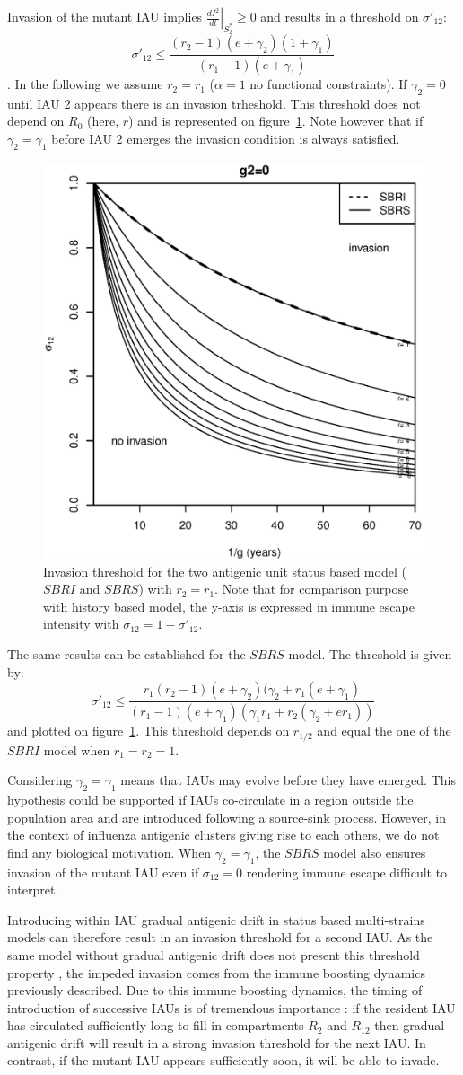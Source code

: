 Invasion of the mutant IAU implies $\left. \frac{d I^2}{d t}
\right|_{S_2^*} \geq 0$ and results in a threshold on $\sigma'_{12}$:
 $$\sigma'_{12} \leq \frac{(r_2-1)(e+\gamma_2)(1+\gamma_1)}{(r_1-1)(e+\gamma_1)}$$.  
 In the following we assume $r_2=r_1$ ($\alpha=1$ no functional
 constraints). If $\gamma_2=0$ until IAU 2 appears there is an
 invasion trheshold. This threshold does not depend on $R_0$ (here,
 $r$) and is represented on figure~\ref{fig:threshold_koelle}. Note
 however that if $\gamma_2=\gamma_1$ before IAU 2 emerges the invasion
 condition is always satisfied.

\begin{figure}[!htbp]
  \center
  \includegraphics[width=0.3\linewidth]{texte/article3/appendix_diamond/graph/threshold_koelle.eps}
  \caption{Invasion threshold for the two antigenic unit status based
    model ($SBRI$ and $SBRS$) with $r_2=r_1$. Note that for comparison
    purpose with history based model, the y-axis is expressed in
    immune escape intensity with $\sigma_{12}=1-\sigma'_{12}$.}
  \label{fig:threshold_koelle}
\end{figure}

The same results can be established for the $SBRS$ model. The
threshold is given by:
$$\sigma'_{12} \leq \frac{r_1 (r_2-1) (e+\gamma_2)
  (\gamma_2 +r_1(e+\gamma_1)}{(r_1-1)(e+\gamma_1) (\gamma_1 r_1
  +r_2(\gamma_2+e r_1))}$$ and plotted on
figure~\ref{fig:threshold_koelle}.  This threshold depends on $r_{1/2}$
and equal the one of the $SBRI$ model when $r_{1}=r_{2}=1$.

Considering $\gamma_2=\gamma_1$ means that IAUs may evolve
before they have emerged. This hypothesis could be supported if
IAUs co-circulate in a region outside the population area and are
introduced following a source-sink process. However, in the context
of influenza antigenic clusters giving rise to each others, we do not find any biological
motivation.  When $\gamma_2=\gamma_1$, the $SBRS$ model also ensures
invasion of the mutant IAU even if $\sigma_{12}=0$ rendering
immune escape difficult to interpret.

Introducing within IAU gradual antigenic drift in status based
multi-strains models can therefore result in an invasion threshold for
a second IAU. As the same model without gradual antigenic
drift does not present this threshold property \citep{Ballesteros2009},
the impeded invasion comes from the immune boosting dynamics
previously described. Due to this immune boosting dynamics, the timing
of introduction of successive IAUs is of tremendous importance
: if the resident IAU has circulated sufficiently long to
fill in compartments $R_2$ and $R_{12}$ then gradual
antigenic drift will result in a strong invasion threshold for the
next IAU. In contrast, if the mutant IAU appears
sufficiently soon, it will be able to invade. 

